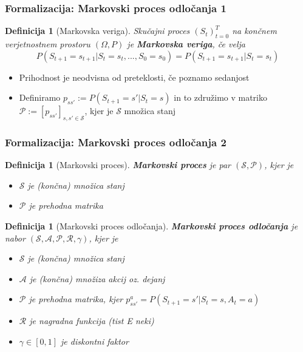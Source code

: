 \documentclass{beamer}    %
\newtheorem{definicija}[izrek]{Definicija}
\begin{document}
\begin{frame}
    \frametitle{Formalizacija: Markovski proces odločanja 1}
    \begin{definicija}[Markovska veriga]
        Skučajni proces $(S_t)_{t=0}^T$ na končnem verjetnostnem prostoru 
        $(\Omega, P)$ je \textbf{Markovska veriga}, če velja 
        $$
        P(S_{t+1} = s_{t+1}|S_{t} = s_{t}, ..., S_0 = s_0) = P(S_{t+1} = s_{t+1}|S_{t} = s_{t})
        $$
    \end{definicija}
    \pause
    \medskip
    \begin{itemize}
        \item Prihodnost je neodvisna od preteklosti, če poznamo sedanjost
        \pause
        \item Definiramo $p_{ss'} := P(S_{t+1} = s'|S_{t} = s)$ in to združimo v matriko
                $\mathcal{P} := [p_{ss'}]_{s,s'\in \mathcal{S} }$, kjer je $\mathcal{S}$ 
                množica stanj
    \end{itemize}
    
\end{frame}


\begin{frame}
    \frametitle{Formalizacija: Markovski proces odločanja 2}
    \begin{definicija}[Markovski proces]
        \textbf{Markovski proces} je par $(\mathcal{S}, \mathcal{P})$, kjer je
        \begin{itemize}
            \item $\mathcal{S}$ je (končna) množica stanj
            \item $\mathcal{P}$ je prehodna matrika
        \end{itemize}
    \end{definicija}
    \pause
    \begin{definicija}[Markovski proces odločanja]
        \textbf{Markovski proces odločanja} je nabor 
        $(\mathcal{S}, \mathcal{A}, \mathcal{P}, \mathcal{R}, \gamma)$, kjer je
        \begin{itemize}
            \item $\mathcal{S}$ je (končna) množica stanj
            \item $\mathcal{A}$ je (končna) množiza akcij oz. dejanj
            \item $\mathcal{P}$ je prehodna matrika, kjer $p_{ss'}^a = P(S_{t+1} = s'|S_{t} = s, A_t = a)$
            \item $\mathcal{R}$ je nagradna funkcija (tist E neki)
            \item $\gamma \in [0, 1]$ je diskontni faktor
        \end{itemize}
    \end{definicija}
\end{frame}
\end{document}
